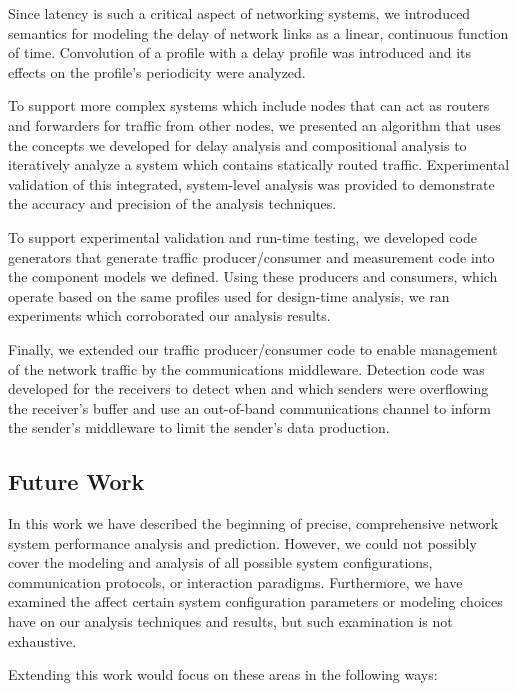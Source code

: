 Since latency is such a critical aspect of networking systems, we
introduced semantics for modeling the delay of network links as a
linear, continuous function of time.  Convolution of a profile with a
delay profile was introduced and its effects on the profile's
periodicity were analyzed.

To support more complex systems which include nodes that can act as
routers and forwarders for traffic from other nodes, we presented an
algorithm that uses the concepts we developed for delay analysis and
compositional analysis to iteratively analyze a system which contains
statically routed traffic.  Experimental validation of this
integrated, system-level analysis was provided to demonstrate the
accuracy and precision of the analysis techniques.  

To support experimental validation and run-time testing, we developed
code generators that generate traffic producer/consumer and
measurement code into the component models we defined.  Using these
producers and consumers, which operate based on the same profiles used
for design-time analysis, we ran experiments which corroborated our
analysis results.

Finally, we extended our traffic producer/consumer code to enable
management of the network traffic by the communications middleware.
Detection code was developed for the receivers to detect when and
which senders were overflowing the receiver's buffer and use an
out-of-band communications channel to inform the sender's middleware
to limit the sender's data production.  

\subsection{Future Work}
\label{subsec:future_work}
In this work we have described the beginning of precise, comprehensive
network system performance analysis and prediction.  However, we could
not possibly cover the modeling and analysis of all possible system
configurations, communication protocols, or interaction paradigms.
Furthermore, we have examined the affect certain system configuration
parameters or modeling choices have on our analysis techniques and
results, but such examination is not exhaustive.

Extending this work would focus on these areas in the following ways:

